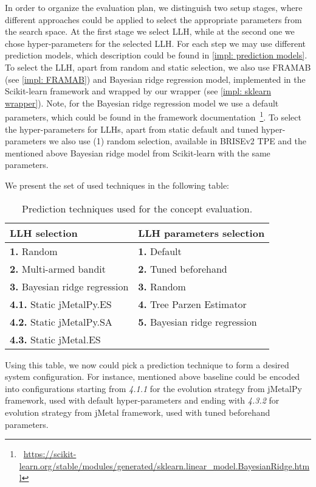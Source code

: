 In order to organize the evaluation plan, we distinguish two setup stages, where different approaches could be applied to select the appropriate parameters from the search space. 
At the first stage we select LLH, while at the second one we chose hyper-parameters for the selected LLH. For each step we may use different prediction models, which description could be found in \cref{impl: prediction models}. To select the LLH, apart from random and static selection, we also use FRAMAB (see \cref{impl: FRAMAB}) and Bayesian ridge regression model, implemented in the Scikit-learn framework and wrapped by our wrapper (see \cref{impl: sklearn wrapper}). Note, for the Bayesian ridge regression model we use a default parameters, which could be found in the framework documentation~\footnote{~\url{https://scikit-learn.org/stable/modules/generated/sklearn.linear_model.BayesianRidge.html}}. To select the hyper-parameters for LLHs, apart from static default and tuned hyper-parameters we also use (1) random selection, available in BRISEv2 TPE and the mentioned above Bayesian ridge model from Scikit-learn with the same parameters.

We present the set of used techniques in the following table:
\begin{table}[h!]
	\centering
	\begin{tabular}{l||l}
		\textbf{LLH selection} & \textbf{LLH parameters selection} \\
		\hline
		\hline
		\textbf{1.} Random & \textbf{1.} Default \\
		\textbf{2.} Multi-armed bandit & \textbf{2.} Tuned beforehand \\
		\textbf{3.} Bayesian ridge regression & \textbf{3.} Random \\
		\textbf{4.1.} Static jMetalPy.ES & \textbf{4.} Tree Parzen Estimator \\
		\textbf{4.2.} Static jMetalPy.SA & \textbf{5.} Bayesian ridge regression\\
		\textbf{4.3.} Static jMetal.ES & 
	\end{tabular}
	
	\caption{Prediction techniques used for the concept evaluation.}
	\label{eval: concept settings table}
\end{table}


Using this table, we now could pick a prediction technique to form a desired system configuration. For instance, mentioned above baseline could be encoded into configurations starting from \emph{4.1.1} for the evolution strategy from jMetalPy framework, used with default hyper-parameters and ending with \emph{4.3.2} for evolution strategy from jMetal framework, used with tuned beforehand parameters.

